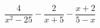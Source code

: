 \begin{ex}[type=expression]
	\begin{condition}
		\(\dfrac{4}{x^2-25}-\dfrac{2}{x+5}-\dfrac{x+2}{5-x}\)
	\end{condition}
\end{ex}